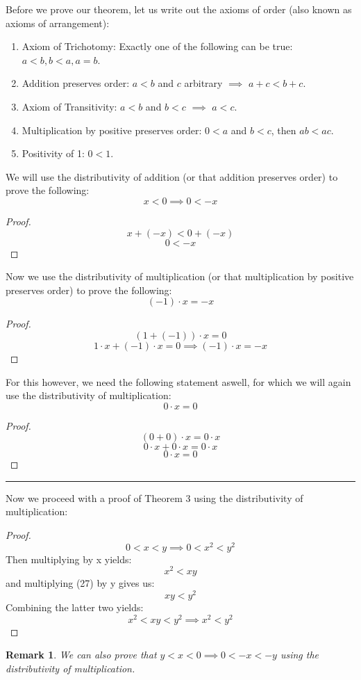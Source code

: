 \documentclass{article}
\newtheorem*{remark}{Remark}
\begin{document}
Before we prove our theorem, let us write out the axioms of order (also known as axioms of arrangement):
\begin{enumerate}
    \item Axiom of Trichotomy: Exactly one of the following can be true: $a < b, b < a, a = b$.
    \item Addition preserves order: $a < b$ and $c$ arbitrary $\implies$ $a + c < b + c$.
    \item  Axiom of Transitivity: $a < b$ and $b < c$ $\implies$ $a < c$.
    \item Multiplication by positive preserves order: $0 < a$ and $b < c$, then $ab < ac$.
    \item Positivity of 1: $0 < 1$.
\end{enumerate}
We will use the distributivity of addition (or that addition preserves order) to prove the following:
\[
    x < 0 \implies 0 < -x
\]
\begin{proof}
\[
    x + (-x) < 0 + (-x)
\]
\[
    0 < -x
\]
\end{proof}
Now we use the distributivity of multiplication (or that multiplication by positive preserves order) to prove the following:
\[
    (-1)\cdot x = -x
\]
\begin{proof}
\[
    (1 + (-1)) \cdot x = 0
\]
\[
    1 \cdot x + (-1) \cdot x = 0 \implies (-1) \cdot x = -x
\]
\end{proof}
For this however, we need the following statement aswell, for which we will again use the distributivity of multiplication:
\[
    0\cdot x = 0
\]
\begin{proof}
\[
    (0+0) \cdot x = 0 \cdot x
\]
\[
    0 \cdot x + 0 \cdot x = 0 \cdot x
\]
\[
    0 \cdot x = 0
\]
\end{proof}

\hrule
\vspace{1em}

Now we proceed with a proof of Theorem 3 using the distributivity of multiplication:

\begin{proof}
    \begin{equation}
    0 < x < y \implies 0 < x^2 < y^2
    \end{equation}
    Then multiplying by x yields:
    \[
    x^2 < xy
    \]
    and multiplying (27) by y gives us:
    \[
    xy < y^2
    \]
    Combining the latter two yields:
    \[
    x^2 < xy < y^2 \implies x^2 < y^2
    \]
\end{proof}

\begin{remark}
    We can also prove that $y < x < 0 \implies 0 < -x < -y$ using the distributivity of multiplication.
\end{remark}
\end{document}
